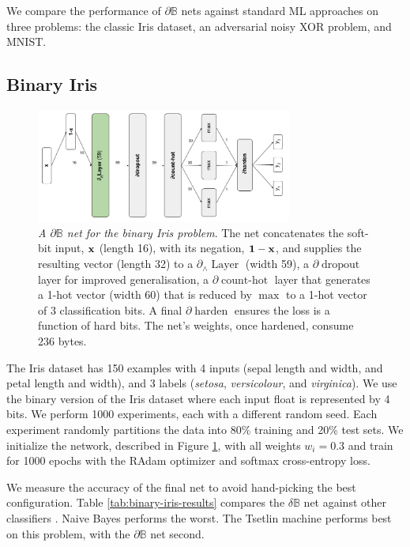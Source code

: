 \documentclass{article}
\theoremstyle{plain}
\theoremstyle{definition}
\theoremstyle{remark}
\begin{document}
We compare the performance of $\partial\mathbb{B}$ nets against standard ML approaches on three problems: the classic Iris dataset, an adversarial noisy XOR problem, and MNIST. 

\subsection{Binary Iris}

\begin{figure}
	\centering
	\includegraphics[width=0.75\textwidth]{../binary-iris-architecture.png}
	\caption{{\em A $\partial\mathbb{B}$ net for the binary Iris problem}. The net concatenates the soft-bit input, ${\bf x}$ (length 16), with its negation, ${\bf 1 - x}$, and supplies the resulting vector (length 32) to a $\partial_{\wedge}\!\operatorname{Layer}$ (width 59), a $\partial\!\operatorname{dropout}$ layer for improved generalisation, a $\partial\!\operatorname{count-hot}$ layer that generates a 1-hot vector (width 60) that is reduced by $\operatorname{max}$ to a 1-hot vector of 3 classification bits. A final $\partial\!\operatorname{harden}$ ensures the loss is a function of hard bits. The net's weights, once hardened, consume $236$ bytes.}
	\label{fig:binary-iris-architecture}
\end{figure}


The Iris dataset has 150 examples with 4 inputs (sepal length and width, and petal length and width), and 3 labels ({\em setosa}, {\em versicolour}, and {\em virginica}). We use the binary version of the Iris dataset \cite{binary-iris-dataset} where each input float is represented by 4 bits. We perform 1000 experiments, each with a different random seed. Each experiment randomly partitions the data into 80\% training and 20\% test sets. We initialize the network, described in Figure \ref{fig:binary-iris-architecture}, with all weights $w_{i} = 0.3$ and train for 1000 epochs with the RAdam optimizer and softmax cross-entropy loss. 

We measure the accuracy of the final net to avoid hand-picking the best configuration. Table \ref{tab:binary-iris-results} compares the $\delta\mathbb{B}$ net against other classifiers  \cite{granmo18}. Naive Bayes performs the worst. The Tsetlin machine performs best on this problem, with the $\partial\mathbb{B}$ net second.
\end{document}
